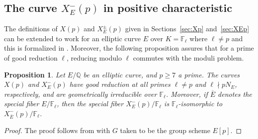 \documentclass[12pt]{amsart}
\numberwithin{equation}{section}
\newtheorem{proposition}[equation]{Proposition}
\theoremstyle{definition}
\newcommand{\F}{\mathbb{F}}
\newcommand{\Q}{\mathbb{Q}}
\newcommand{\Xp}{X_E^{-}(p)}
\newcommand{\oE}{\overline{E}}
\begin{document}
\subsection{The curve $X_E^-(p)$ in positive characteristic}
The definitions of $X(p)$ and $X_E^\pm(p)$ given in Sections~\ref{sec:Xp} and~\ref{sec:XEp} can be extended to work for an elliptic curve $E$ over $K=\F_\ell$ where $\ell \neq p$ and this is formalized in \cite[Corollary 1 (a)--(b)]{elie}. Moreover, the following proposition assures that for a prime of good reduction $\ell$, reducing modulo $\ell$ commutes with the moduli problem. 
\begin{proposition}\label{prop:elie}
Let $E/\Q$ be an elliptic curve, and $p\geq 7$ a prime.
The curves $X(p)$ and $\Xp$ have good reduction at all primes $\ell \neq p$ and $\ell \nmid pN_E$, respectively, and are geometrically irreducible over $\F_\ell$. Moreover, if $\oE$ denotes the special fiber $E/\F_\ell$, then the special fiber $X_E^-(p)/\F_\ell$ is $\F_\ell$-isomorphic to $X_{\oE}^-(p)/\F_\ell$.    
\end{proposition}
\begin{proof}
The proof follows from \cite[Corollary 1]{elie} with $G$ taken to be the group scheme $E[p]$.
\end{proof}
\end{document}
